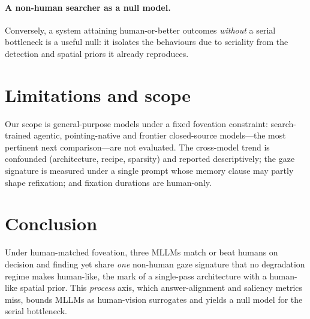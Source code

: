 \documentclass[runningheads]{llncs}
\begin{document}
\paragraph{A non-human searcher as a null model.} Conversely, a system attaining human-or-better outcomes
\emph{without} a serial bottleneck is a useful null: it isolates the behaviours due to seriality from the detection and spatial priors it
already reproduces.
 
 
\vspace{-5mm}
\section{Limitations and scope}
\label{sec:lim}
Our scope is general-purpose models under a fixed foveation constraint: search-trained agentic,
pointing-native and frontier closed-source models---the most pertinent next comparison---are not evaluated.
The cross-model trend is confounded (architecture, recipe, sparsity) and reported descriptively; the gaze
signature is measured under a single prompt whose memory clause may partly shape refixation; and fixation
durations are human-only.
 
 \vspace{-2mm}
\section{Conclusion}
Under human-matched foveation, three MLLMs match or beat humans on decision and finding yet share \emph{one} non-human gaze signature that no degradation regime makes human-like, the mark of a single-pass architecture with a human-like spatial prior. This \emph{process} axis, which answer-alignment and saliency metrics miss, bounds MLLMs as human-vision surrogates and yields a null model for the serial bottleneck.



\end{document}
